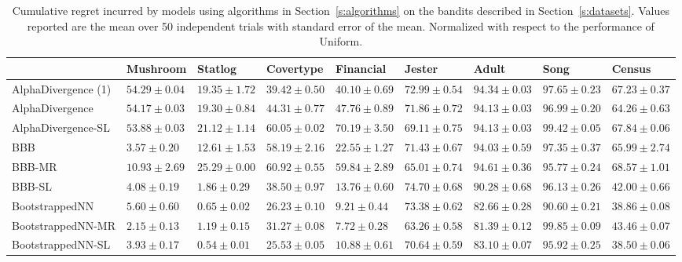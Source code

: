 \documentclass{article} \usepackage{iclr2018_conference,times}
\begin{document}
\begin{landscape}
\begin{table}[ht]
  \caption{Cumulative regret incurred by models using algorithms in Section~\ref{s:algorithms} on the bandits described in Section~\ref{s:datasets}. Values reported are the mean over 50 independent trials with standard error of the mean. Normalized with respect to the performance of Uniform.}
  \label{tab:nonlinear_cum_regret_appendix}
  \centering
  \footnotesize
  \tiny
	\vspace*{\fill}
	\begin{adjustbox}{center}
	\begin{tabular}{lllllllll}
 & Mushroom & Statlog & Covertype & Financial & Jester & Adult & Song & Census \\
\midrule
AlphaDivergence (1) & $54.29 \pm 0.04$& $19.35 \pm 1.72$& $39.42 \pm 0.50$& $40.10 \pm 0.69$& $72.99 \pm 0.54$& $94.34 \pm 0.03$& $97.65 \pm 0.23$& $67.23 \pm 0.37$ \\
AlphaDivergence & $54.17 \pm 0.03$& $19.30 \pm 0.84$& $44.31 \pm 0.77$& $47.76 \pm 0.89$& $71.86 \pm 0.72$& $94.13 \pm 0.03$& $96.99 \pm 0.20$& $64.26 \pm 0.63$ \\
AlphaDivergence-SL & $53.88 \pm 0.03$& $21.12 \pm 1.14$& $60.05 \pm 0.02$& $70.19 \pm 3.50$& $69.11 \pm 0.75$& $94.13 \pm 0.03$& $99.42 \pm 0.05$& $67.84 \pm 0.06$ \\
BBB & $3.57 \pm 0.20$& $12.61 \pm 1.53$& $58.19 \pm 2.16$& $22.55 \pm 1.27$& $71.43 \pm 0.67$& $94.03 \pm 0.59$& $97.35 \pm 0.37$& $65.99 \pm 2.74$ \\
BBB-MR & $10.93 \pm 2.69$& $25.29 \pm 0.00$& $60.92 \pm 0.55$& $59.84 \pm 2.89$& $65.01 \pm 0.74$& $94.61 \pm 0.36$& $95.77 \pm 0.24$& $68.57 \pm 1.01$ \\
BBB-SL & $4.08 \pm 0.19$& $1.86 \pm 0.29$& $38.50 \pm 0.97$& $13.76 \pm 0.60$& $74.70 \pm 0.68$& $90.28 \pm 0.68$& $96.13 \pm 0.26$& $42.00 \pm 0.66$ \\
BootstrappedNN & $5.60 \pm 0.60$& $0.65 \pm 0.02$& $26.23 \pm 0.10$& $9.21 \pm 0.44$& $73.38 \pm 0.62$& $82.66 \pm 0.28$& $90.60 \pm 0.21$& $38.86 \pm 0.08$ \\
BootstrappedNN-MR & $2.15 \pm 0.13$& $1.19 \pm 0.15$& $31.27 \pm 0.08$& $7.72 \pm 0.28$& $63.26 \pm 0.58$& $81.39 \pm 0.12$& $99.85 \pm 0.09$& $43.46 \pm 0.07$ \\
BootstrappedNN-SL & $3.93 \pm 0.17$& $0.54 \pm 0.01$& $25.53 \pm 0.05$& $10.88 \pm 0.61$& $70.64 \pm 0.59$& $83.10 \pm 0.07$& $95.92 \pm 0.25$& $38.50 \pm 0.06$ \\

\end{tabular}
\end{adjustbox}
\end{table}
\end{landscape}
\end{document}
